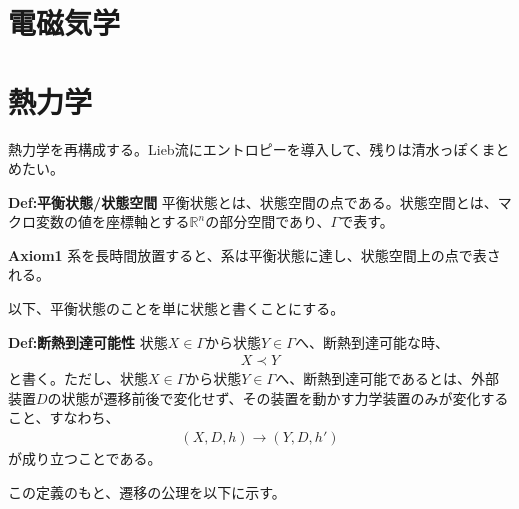 \documentclass[a4paper,11pt]{jsarticle}
\numberwithin{equation}{section}
\begin{document}
\section{電磁気学}

\section{熱力学}
熱力学を再構成する。Lieb流にエントロピーを導入して、残りは清水っぽくまとめたい。\\

\begin{itembox}[l]{\textbf{Def:平衡状態/状態空間}}
  平衡状態とは、状態空間の点である。状態空間とは、マクロ変数の値を座標軸とする$\mathbb{R}^n$の部分空間であり、$\Gamma$で表す。
\end{itembox}

\begin{itembox}[l]{\textbf{Axiom1}}
  系を長時間放置すると、系は平衡状態に達し、状態空間上の点で表される。
\end{itembox}

以下、平衡状態のことを単に状態と書くことにする。\\

\begin{itembox}[l]{\textbf{Def:断熱到達可能性}}
  状態$X \in \Gamma$から状態$Y \in \Gamma$へ、断熱到達可能な時、
  \begin{align}
    X \prec Y
  \end{align}
  と書く。ただし、状態$X \in \Gamma$から状態$Y \in \Gamma$へ、断熱到達可能であるとは、外部装置$D$の状態が遷移前後で変化せず、その装置を動かす力学装置のみが変化すること、すなわち、
  \begin{align}
    (X , D , h) \rightarrow (Y , D , h')
  \end{align}
  が成り立つことである。

\end{itembox}
この定義のもと、遷移の公理を以下に示す。\\
\end{document}
